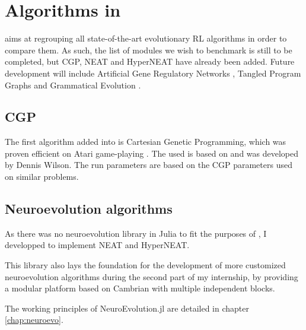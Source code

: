 \section{Algorithms in \berl}

\berl aims at regrouping all state-of-the-art evolutionary RL algorithms in order to compare them. As such, the list of modules we wish to benchmark is still to be completed, but CGP, NEAT and HyperNEAT have already been added. Future development will include Artificial Gene Regulatory Networks \cite{GRN}, Tangled Program Graphs \cite{tpg} and Grammatical Evolution \cite{grammatical-evo}.

\subsection{CGP}

The first algorithm added into \berl is Cartesian Genetic Programming, which was proven efficient on Atari game-playing \cite{CGP}. The  used is based on  and was developed by Dennis Wilson. The run parameters are based on the CGP parameters used on similar problems. 

\subsection{Neuroevolution algorithms}

As there was no neuroevolution library in Julia to fit the purposes of \berl, I developped  to implement NEAT and HyperNEAT.

This library also lays the foundation for the development of more customized neuroevolution algorithms during the second part of my internship, by providing a modular platform based on Cambrian with multiple independent blocks. 

The working principles of NeuroEvolution.jl are detailed in chapter \ref{chap:neuroevo}.


